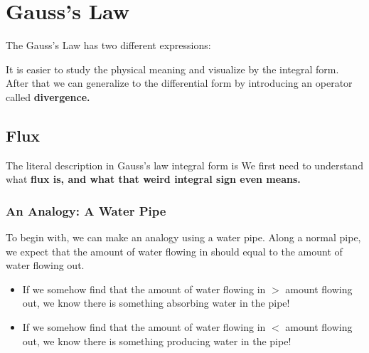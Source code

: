 \documentclass[class=article, crop=false, 12pt]{standalone}
\begin{document}
\linesep
\section{Gauss's Law}

The Gauss's Law has two different expressions:

It is easier to study the physical meaning and visualize by the integral form.
After that we can generalize to the differential form by introducing an operator called \bf{divergence}.

\subsection{Flux}

The literal description in Gauss's law integral form is
We first need to understand what \bf{flux} is, 
and what that weird integral sign even means.

\subsubsection{An Analogy: A Water Pipe}

To begin with, we can make an analogy using a water pipe.
Along a normal pipe, we expect that the amount of water flowing in
should equal to the amount of water flowing out.


\begin{itemize}
    \item If we somehow find that the amount of water flowing in $>$ amount flowing out,
    we know there is something absorbing water in the pipe! 


    \item If we somehow find that the amount of water flowing in $<$ amount flowing out,
    we know there is something producing water in the pipe! 


\end{itemize}
\end{document}
